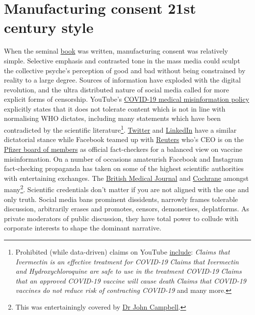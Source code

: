 \documentclass[11pt,a4paper,notitlepage]{report}
\begin{document}

\section*{Manufacturing consent 21st century style}

When the seminal \href{https://en.wikipedia.org/wiki/Manufacturing_Consent}{book} was written, manufacturing consent was  relatively simple. Selective emphasis and contrasted tone in the mass media could sculpt the collective psyche's perception of good and bad without being constrained by reality to a large degree. Sources of information have exploded with the digital revolution, and the ultra distributed nature of social media called for more explicit forms of censorship. YouTube's \href{https://support.google.com/youtube/answer/9891785}{COVID-19 medical misinformation policy} explicitly states that it does not tolerate content which is not in line with normalising WHO dictates, including many statements which have been contradicted by the scientific literature\footnote{Prohibited (while data-driven) claims on YouTube \href{https://support.google.com/youtube/answer/9891785}{include}: \textit{Claims that Ivermectin is an effective treatment for COVID-19} \cite{Kerr2022-ps} \cite{EFIMENKO2022S40} \textit{Claims that Ivermectin and Hydroxychloroquine are safe to use in the treatment COVID-19} \cite{wentzel2021} \textit{Claims that an approved COVID-19 vaccine will cause death} \cite{cdc14032022} \textit{Claims that COVID-19 vaccines do not reduce risk of contracting COVID-19} \cite{Hansen2021.12.20.21267966} and many more.}. \href{https://help.twitter.com/en/rules-and-policies/medical-misinformation-policy}{Twitter} and \href{https://news.linkedin.com/2020/march/promoting-trusted-information-on-covid-19}{LinkedIn} have a similar dictatorial stance while Facebook teamed up with \href{https://www.reuters.com/article/us-facebook-partnership-reuters-idUSKBN2062K4}{Reuters} \cite{reuters12022020} who's CEO is on the \href{https://www.pfizer.com/people/leadership/board_of_directors/james_smith}{Pfizer board of members} \cite{pfizer-james-smith} as official fact-checkers for a balanced view on vaccine misinformation. On a number of occasions amateurish Facebook and Instagram fact-checking propaganda has taken on some of the highest scientific authorities with entertaining exchanges. The \href{https://www.bmj.com/content/376/bmj.o95}{British Medical Journal} \cite{bmj19012022b} and \href{https://www.acsh.org/news/2021/11/14/covid-misinformation-blunder-instagram-censors-widely-respected-cochrane-collaboration-15937}{Cochrane} \cite{acsh14112021} amongst many\footnote{This was entertainingly covered by \href{https://www.youtube.com/watch?v=lMf-Zq7xJcY}{Dr John Campbell}.}. Scientific credentials don't matter if you are not aligned with the one and only truth. Social media bans prominent dissidents, narrowly frames tolerable discussion, arbitrarily erases and promotes, censors, demonetises, deplatforms. As private moderators of public discussion, they have total power to collude with corporate interests to shape the dominant narrative.
\end{document}
